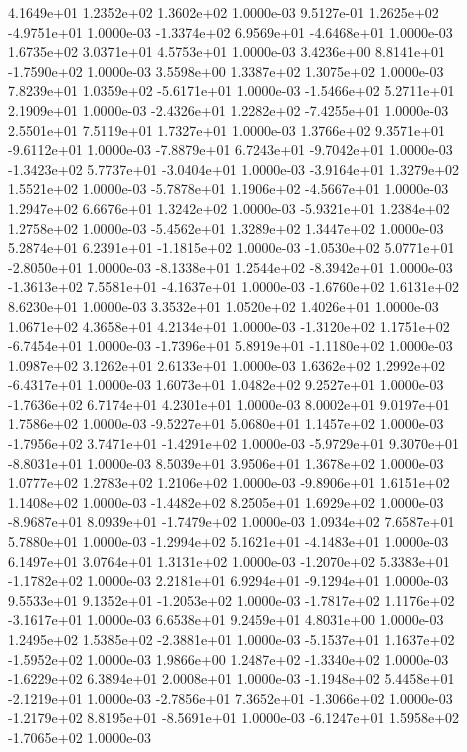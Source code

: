 4.1649e+01 1.2352e+02 1.3602e+02  1.0000e-03
 9.5127e-01  1.2625e+02 -4.9751e+01  1.0000e-03
-1.3374e+02  6.9569e+01 -4.6468e+01  1.0000e-03
1.6735e+02 3.0371e+01 4.5753e+01  1.0000e-03
 3.4236e+00  8.8141e+01 -1.7590e+02  1.0000e-03
3.5598e+00 1.3387e+02 1.3075e+02  1.0000e-03
 7.8239e+01  1.0359e+02 -5.6171e+01  1.0000e-03
-1.5466e+02  5.2711e+01  2.1909e+01  1.0000e-03
-2.4326e+01  1.2282e+02 -7.4255e+01  1.0000e-03
2.5501e+01 7.5119e+01 1.7327e+01  1.0000e-03
 1.3766e+02  9.3571e+01 -9.6112e+01  1.0000e-03
-7.8879e+01  6.7243e+01 -9.7042e+01  1.0000e-03
-1.3423e+02  5.7737e+01 -3.0404e+01  1.0000e-03
-3.9164e+01  1.3279e+02  1.5521e+02  1.0000e-03
-5.7878e+01  1.1906e+02 -4.5667e+01  1.0000e-03
1.2947e+02 6.6676e+01 1.3242e+02  1.0000e-03
-5.9321e+01  1.2384e+02  1.2758e+02  1.0000e-03
-5.4562e+01  1.3289e+02  1.3447e+02  1.0000e-03
 5.2874e+01  6.2391e+01 -1.1815e+02  1.0000e-03
-1.0530e+02  5.0771e+01 -2.8050e+01  1.0000e-03
-8.1338e+01  1.2544e+02 -8.3942e+01  1.0000e-03
-1.3613e+02  7.5581e+01 -4.1637e+01  1.0000e-03
-1.6760e+02  1.6131e+02  8.6230e+01  1.0000e-03
3.3532e+01 1.0520e+02 1.4026e+01  1.0000e-03
1.0671e+02 4.3658e+01 4.2134e+01  1.0000e-03
-1.3120e+02  1.1751e+02 -6.7454e+01  1.0000e-03
-1.7396e+01  5.8919e+01 -1.1180e+02  1.0000e-03
1.0987e+02 3.1262e+01 2.6133e+01  1.0000e-03
 1.6362e+02  1.2992e+02 -6.4317e+01  1.0000e-03
1.6073e+01 1.0482e+02 9.2527e+01  1.0000e-03
-1.7636e+02  6.7174e+01  4.2301e+01  1.0000e-03
8.0002e+01 9.0197e+01 1.7586e+02  1.0000e-03
-9.5227e+01  5.0680e+01  1.1457e+02  1.0000e-03
-1.7956e+02  3.7471e+01 -1.4291e+02  1.0000e-03
-5.9729e+01  9.3070e+01 -8.8031e+01  1.0000e-03
8.5039e+01 3.9506e+01 1.3678e+02  1.0000e-03
1.0777e+02 1.2783e+02 1.2106e+02  1.0000e-03
-9.8906e+01  1.6151e+02  1.1408e+02  1.0000e-03
-1.4482e+02  8.2505e+01  1.6929e+02  1.0000e-03
-8.9687e+01  8.0939e+01 -1.7479e+02  1.0000e-03
1.0934e+02 7.6587e+01 5.7880e+01  1.0000e-03
-1.2994e+02  5.1621e+01 -4.1483e+01  1.0000e-03
6.1497e+01 3.0764e+01 1.3131e+02  1.0000e-03
-1.2070e+02  5.3383e+01 -1.1782e+02  1.0000e-03
 2.2181e+01  6.9294e+01 -9.1294e+01  1.0000e-03
 9.5533e+01  9.1352e+01 -1.2053e+02  1.0000e-03
-1.7817e+02  1.1176e+02 -3.1617e+01  1.0000e-03
6.6538e+01 9.2459e+01 4.8031e+00  1.0000e-03
 1.2495e+02  1.5385e+02 -2.3881e+01  1.0000e-03
-5.1537e+01  1.1637e+02 -1.5952e+02  1.0000e-03
 1.9866e+00  1.2487e+02 -1.3340e+02  1.0000e-03
-1.6229e+02  6.3894e+01  2.0008e+01  1.0000e-03
-1.1948e+02  5.4458e+01 -2.1219e+01  1.0000e-03
-2.7856e+01  7.3652e+01 -1.3066e+02  1.0000e-03
-1.2179e+02  8.8195e+01 -8.5691e+01  1.0000e-03
-6.1247e+01  1.5958e+02 -1.7065e+02  1.0000e-03
